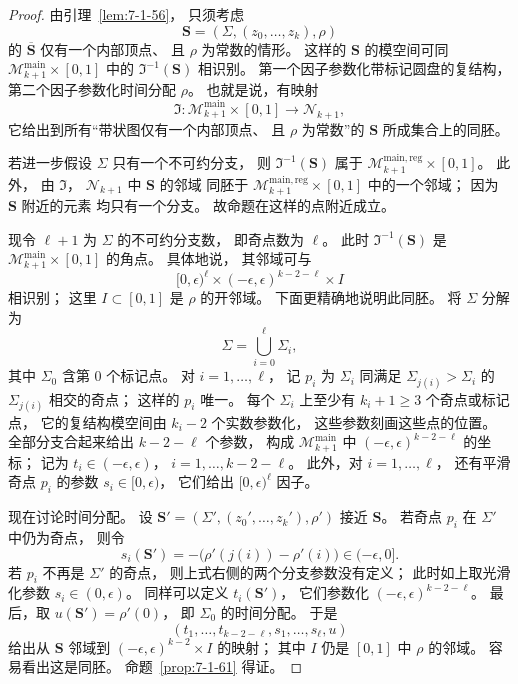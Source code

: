 \begin{proof}
由引理~\ref{lem:7-1-56}，
只须考虑
\[
\mathbf S=(\Sigma,(z_0,\ldots,z_k),\rho)
\]
的
$\overline{\mathbf S}$
仅有一个内部顶点、
且 $\rho$ 为常数的情形。
这样的 $\mathbf S$
的模空间可同
$\mathcal M^{\mathrm{main}}_{k+1}
\times[0,1]$
中的
$\mathfrak I^{-1}(\mathbf S)$
相识别。
第一个因子参数化带标记圆盘的复结构，
第二个因子参数化时间分配 $\rho$。
也就是说，有映射
\begin{equation}
\mathfrak I\colon
\mathcal M^{\mathrm{main}}_{k+1}
\times[0,1]
\longrightarrow
\mathcal N_{k+1},
\tag{7.1.62}\label{eq:7-1-62}
\end{equation}
它给出到所有“带状图仅有一个内部顶点、
且 $\rho$ 为常数”的
$\mathbf S$ 所成集合上的同胚。

若进一步假设 $\Sigma$
只有一个不可约分支，
则
$\mathfrak I^{-1}(\mathbf S)$
属于
$\mathcal M^{\mathrm{main,reg}}_{k+1}
\times[0,1]$。
此外，
由 $\mathfrak I$，
$\mathcal N_{k+1}$
中 $\mathbf S$ 的邻域
同胚于
$\mathcal M^{\mathrm{main,reg}}_{k+1}
\times[0,1]$
中的一个邻域；
因为 $\mathbf S$ 附近的元素
均只有一个分支。
故命题在这样的点附近成立。

现令
$\ell+1$
为 $\Sigma$ 的不可约分支数，
即奇点数为 $\ell$。
此时
$\mathfrak I^{-1}(\mathbf S)$
是
$\mathcal M^{\mathrm{main}}_{k+1}
\times[0,1]$
的角点。
具体地说，
其邻域可与
\[
[0,\epsilon)^\ell
\times
(-\epsilon,\epsilon)^{k-2-\ell}
\times I
\]
相识别；
这里 $I\subset[0,1]$
是 $\rho$ 的开邻域。
下面更精确地说明此同胚。
将 $\Sigma$ 分解为
\[
\Sigma=\bigcup_{i=0}^{\ell}\Sigma_i,
\]
其中 $\Sigma_0$
含第 $0$ 个标记点。
对 $i=1,\ldots,\ell$，
记 $p_i$
为 $\Sigma_i$
同满足
$\Sigma_{j(i)}>\Sigma_i$
的 $\Sigma_{j(i)}$
相交的奇点；
这样的 $p_i$ 唯一。
每个 $\Sigma_i$
上至少有
$k_i+1\ge3$
个奇点或标记点，
它的复结构模空间由
$k_i-2$
个实数参数化，
这些参数刻画这些点的位置。
全部分支合起来给出
$k-2-\ell$
个参数，
构成
$\mathcal M^{\mathrm{main}}_{k+1}$
中
$(-\epsilon,\epsilon)^{k-2-\ell}$
的坐标；
记为
$t_i\in(-\epsilon,\epsilon)$，
$i=1,\ldots,k-2-\ell$。
此外，对
$i=1,\ldots,\ell$，
还有平滑奇点 $p_i$
的参数
$s_i\in[0,\epsilon)$，
它们给出
$[0,\epsilon)^\ell$
因子。

现在讨论时间分配。
设
$\mathbf S'
=(\Sigma',(z_0',\ldots,z_k'),\rho')$
接近 $\mathbf S$。
若奇点 $p_i$
在 $\Sigma'$ 中仍为奇点，
则令
\[
s_i(\mathbf S')
=-\bigl(
\rho'(j(i))-\rho'(i)
\bigr)
\in(-\epsilon,0].
\]
若 $p_i$ 不再是 $\Sigma'$
的奇点，
则上式右侧的两个分支参数没有定义；
此时如上取光滑化参数
$s_i\in(0,\epsilon)$。
同样可以定义
$t_i(\mathbf S')$，
它们参数化
$(-\epsilon,\epsilon)^{k-2-\ell}$。
最后，取
$u(\mathbf S')=\rho'(0)$，
即 $\Sigma_0$ 的时间分配。
于是
\[
(t_1,\ldots,t_{k-2-\ell},
s_1,\ldots,s_\ell,u)
\]
给出从
$\mathbf S$ 邻域到
$(-\epsilon,\epsilon)^{k-2}\times I$
的映射；
其中 $I$ 仍是
$[0,1]$ 中 $\rho$ 的邻域。
容易看出这是同胚。
命题~\ref{prop:7-1-61} 得证。
\end{proof}

